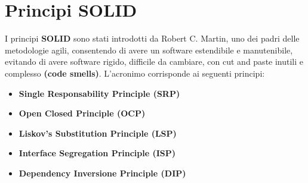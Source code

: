 \documentclass[a4paper, oneside]{book}
\begin{document}
\newpage
\large
\section*{Principi SOLID}
I principi \textbf{SOLID} sono stati introdotti da Robert C. Martin, uno dei padri delle metodologie agili, consentendo di avere un software estendibile e manutenibile, evitando di avere software rigido, difficile da cambiare, con cut and paste inutili e complesso \textbf{(code smells)}. L'acronimo corrisponde ai seguenti principi:

      \begin{itemize}
      
         \item \textbf{Single Responsability Principle (SRP) }

        \item \textbf{Open Closed Principle (OCP)}


        \item \textbf{Liskov's Substitution Principle (LSP)}


        \item \textbf{Interface Segregation Principle (ISP)}
        

        \item \textbf{Dependency Inversione Principle (DIP)}

      \end{itemize}
    
\end{document}
